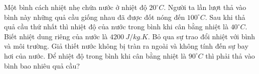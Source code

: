 \begin{ex} 
	Một bình cách nhiệt nhẹ chứa nước ở nhiệt độ $20^\circ C$. Người ta lần lượt thả vào bình này những quả cầu giống nhau đã được đốt nóng đến $100^\circ C$. Sau khi thả quả cầu thứ nhất thì nhiệt độ của nước trong bình khi cân bằng nhiệt là $40^\circ C$. Biết nhiệt dung riêng của nước là $4200 \ J /kg.K$. Bỏ qua sự trao đổi nhiệt với bình và môi trường. Giả thiết nước không bị tràn ra ngoài và không tính đến sự bay hơi của nước. 
	Để nhiệt độ trong bình khi cân bằng nhiệt là $90^\circ C$ thì phải thả vào bình bao nhiêu quả cầu?
\end{ex}
